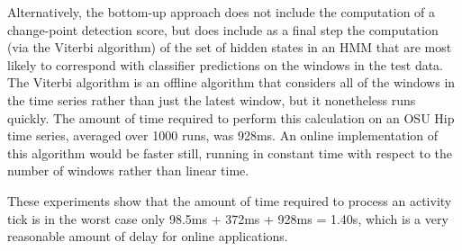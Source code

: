 Alternatively, the bottom-up approach does not include the computation of a
change-point detection score, but does include as a final step the computation
(via the Viterbi algorithm) of the set of hidden states in an HMM that are most
likely to correspond with classifier predictions on the windows in the test data. The Viterbi algorithm is an offline
algorithm that considers all of the windows in the time series rather than just
the latest window, but it nonetheless runs quickly. The amount of time required to perform this
calculation on an OSU Hip time series, averaged over 1000 runs, was 928ms. An
online implementation of this algorithm would be faster still, running
in constant time with respect to the number of windows rather
than linear time.

These experiments show that the amount of time required to process an activity
tick is in the worst case only 98.5ms + 372ms + 928ms = 1.40s, which is a very reasonable amount of delay
for online applications.
